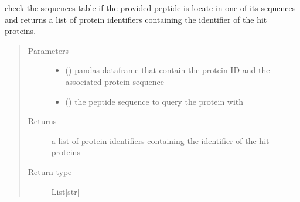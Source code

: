 \documentclass[letterpaper,10pt,english]{sphinxmanual}
\begin{document}
\begin{fulllineitems}
\label{\detokenize{IPTK.Utils:IPTK.Utils.UtilityFunction.get_idx_peptide_in_sequence_table}}
check the sequences table if the provided peptide is locate in one of its sequences and returns 
a list of protein identifiers containing the identifier of the hit proteins.
\begin{quote}\begin{description}
\item[{Parameters}] \leavevmode\begin{itemize}
\item {} 
 () \textendash{} pandas dataframe that contain the protein ID and the associated protein sequence

\item {} 
 () \textendash{} the peptide sequence to query the protein with

\end{itemize}

\item[{Returns}] \leavevmode
a list of protein identifiers containing the identifier of the hit proteins

\item[{Return type}] \leavevmode
List{[}str{]}

\end{description}\end{quote}

\end{fulllineitems}

\end{document}
